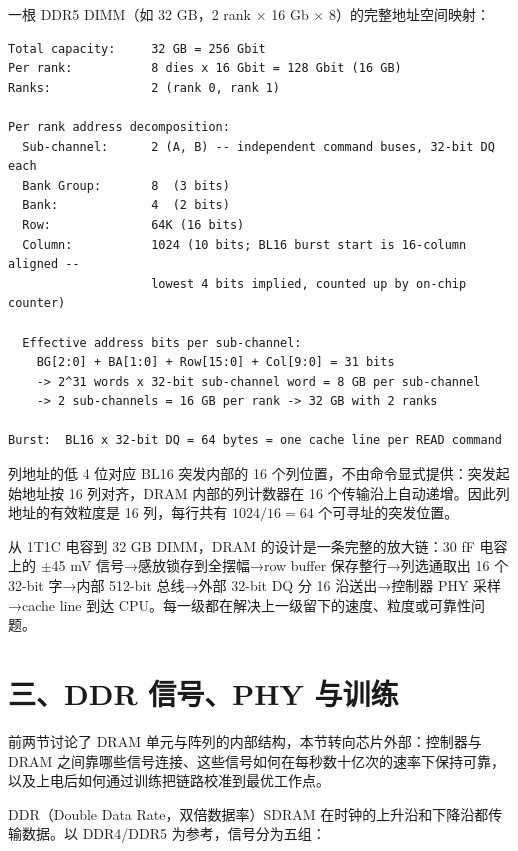 一根 DDR5 DIMM（如 32 GB，2 rank $\times$ 16 Gb $\times$ 8）的完整地址空间映射：

\begin{lstlisting}[numbers=none,caption={DDR5 32GB DIMM 地址分解}]
Total capacity:     32 GB = 256 Gbit
Per rank:           8 dies x 16 Gbit = 128 Gbit (16 GB)
Ranks:              2 (rank 0, rank 1)

Per rank address decomposition:
  Sub-channel:      2 (A, B) -- independent command buses, 32-bit DQ each
  Bank Group:       8  (3 bits)
  Bank:             4  (2 bits)
  Row:              64K (16 bits)
  Column:           1024 (10 bits; BL16 burst start is 16-column aligned --
                    lowest 4 bits implied, counted up by on-chip counter)

  Effective address bits per sub-channel:
    BG[2:0] + BA[1:0] + Row[15:0] + Col[9:0] = 31 bits
    -> 2^31 words x 32-bit sub-channel word = 8 GB per sub-channel
    -> 2 sub-channels = 16 GB per rank -> 32 GB with 2 ranks

Burst:  BL16 x 32-bit DQ = 64 bytes = one cache line per READ command
\end{lstlisting}

列地址的低 4 位对应 BL16 突发内部的 16 个列位置，不由命令显式提供：突发起始地址按 16 列对齐，DRAM 内部的列计数器在 16 个传输沿上自动递增。因此列地址的有效粒度是 16 列，每行共有 $1024 / 16 = 64$ 个可寻址的突发位置。

\begin{keyidea}
从 1T1C 电容到 32 GB DIMM，DRAM 的设计是一条完整的放大链：30 fF 电容上的 $\pm$45 mV 信号→感放锁存到全摆幅→row buffer 保存整行→列选通取出 16 个 32-bit 字→内部 512-bit 总线→外部 32-bit DQ 分 16 沿送出→控制器 PHY 采样→cache line 到达 CPU。每一级都在解决上一级留下的速度、粒度或可靠性问题。
\end{keyidea}

\section{三、DDR 信号、PHY 与训练}


前两节讨论了 DRAM 单元与阵列的内部结构，本节转向芯片外部：控制器与 DRAM 之间靠哪些信号连接、这些信号如何在每秒数十亿次的速率下保持可靠，以及上电后如何通过训练把链路校准到最优工作点。

DDR（Double Data Rate，双倍数据率）SDRAM 在时钟的上升沿和下降沿都传输数据。以 DDR4/DDR5 为参考，信号分为五组：

